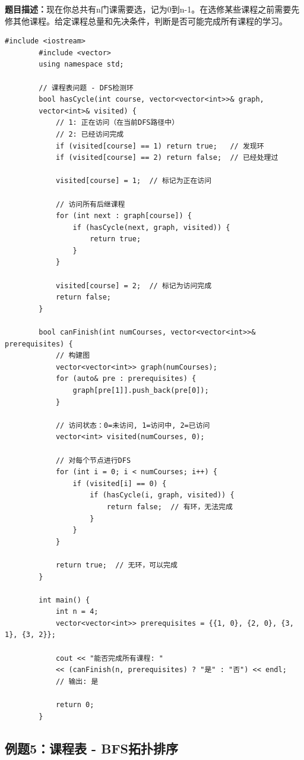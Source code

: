\documentclass[12pt,a4paper]{article}
\begin{document}
	\textbf{题目描述：}现在你总共有n门课需要选，记为0到n-1。在选修某些课程之前需要先修其他课程。给定课程总量和先决条件，判断是否可能完成所有课程的学习。
	
	\begin{lstlisting}[caption={例题4：课程表 - DFS检测环}]
		#include <iostream>
		#include <vector>
		using namespace std;
		
		// 课程表问题 - DFS检测环
		bool hasCycle(int course, vector<vector<int>>& graph, 
		vector<int>& visited) {
			// 1: 正在访问（在当前DFS路径中）
			// 2: 已经访问完成
			if (visited[course] == 1) return true;   // 发现环
			if (visited[course] == 2) return false;  // 已经处理过
			
			visited[course] = 1;  // 标记为正在访问
			
			// 访问所有后继课程
			for (int next : graph[course]) {
				if (hasCycle(next, graph, visited)) {
					return true;
				}
			}
			
			visited[course] = 2;  // 标记为访问完成
			return false;
		}
		
		bool canFinish(int numCourses, vector<vector<int>>& prerequisites) {
			// 构建图
			vector<vector<int>> graph(numCourses);
			for (auto& pre : prerequisites) {
				graph[pre[1]].push_back(pre[0]);
			}
			
			// 访问状态：0=未访问, 1=访问中, 2=已访问
			vector<int> visited(numCourses, 0);
			
			// 对每个节点进行DFS
			for (int i = 0; i < numCourses; i++) {
				if (visited[i] == 0) {
					if (hasCycle(i, graph, visited)) {
						return false;  // 有环，无法完成
					}
				}
			}
			
			return true;  // 无环，可以完成
		}
		
		int main() {
			int n = 4;
			vector<vector<int>> prerequisites = {{1, 0}, {2, 0}, {3, 1}, {3, 2}};
			
			cout << "能否完成所有课程: " 
			<< (canFinish(n, prerequisites) ? "是" : "否") << endl;
			// 输出: 是
			
			return 0;
		}
	\end{lstlisting}
	
	\subsection{例题5：课程表 - BFS拓扑排序}
	
\end{document}
